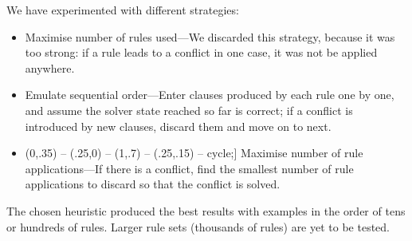 \documentclass[11pt]{article}
\newcommand{\todo}[1]{{\color{cyan}\textbf{[TODO: }#1\textbf{]}}}
\def\checkmark{\tikz\fill[scale=0.4](0,.35) -- (.25,0) -- (1,.7) -- (.25,.15) -- cycle;}
\begin{document}

We have experimented with different strategies:
\begin{itemize}
\item Maximise number of rules used---We discarded this strategy, because it was too strong: if a rule leads to a conflict in one case, it was not be applied anywhere.
\item Emulate sequential order---Enter clauses produced by each rule one by one, and assume the solver state reached so far is correct; if a conflict is introduced by new clauses, discard them and move on to next.
\item [\checkmark] Maximise number of rule applications---If there is a conflict, find the smallest number of rule applications to discard so that the conflict is solved.
\end{itemize}


The chosen heuristic produced the best results with examples in the order of tens or hundreds of rules.
Larger rule sets (thousands of rules) are yet to be tested.

\end{document}
